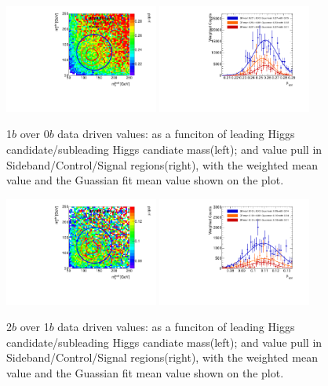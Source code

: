 \begin{figure}[htbp!]
\begin{center}
\includegraphics[angle=270, width=0.45\textwidth]{./figures/boosted/AppendixMuqcdstudy/OneTag_Incl_mH0H1.pdf}
\includegraphics[angle=270, width=0.45\textwidth]{./figures/boosted/AppendixMuqcdstudy/OneTag_Incl_mH0H1_pull.pdf}
\caption{1$b$ over 0$b$ data driven \muqcd values: \muqcd as a funciton of leading Higgs candidate/subleading Higgs candiate mass(left); and \muqcd value pull in Sideband/Control/Signal regions(right), with the weighted mean value and the Guassian fit mean value shown on the plot.}
\label{fig:app-muqcd-1b}
\end{center}
\end{figure}

\begin{figure}[htbp!]
\begin{center}
\includegraphics[angle=270, width=0.45\textwidth]{./figures/boosted/AppendixMuqcdstudy/TwoTag_Incl_mH0H1.pdf}
\includegraphics[angle=270, width=0.45\textwidth]{./figures/boosted/AppendixMuqcdstudy/TwoTag_Incl_mH0H1_pull.pdf}
\caption{2$b$ over 1$b$ data driven \muqcd values: \muqcd as a funciton of leading Higgs candidate/subleading Higgs candiate mass(left); and \muqcd value pull in Sideband/Control/Signal regions(right), with the weighted mean value and the Guassian fit mean value shown on the plot.}
\label{fig:app-muqcd-2b}
\end{center}
\end{figure}

